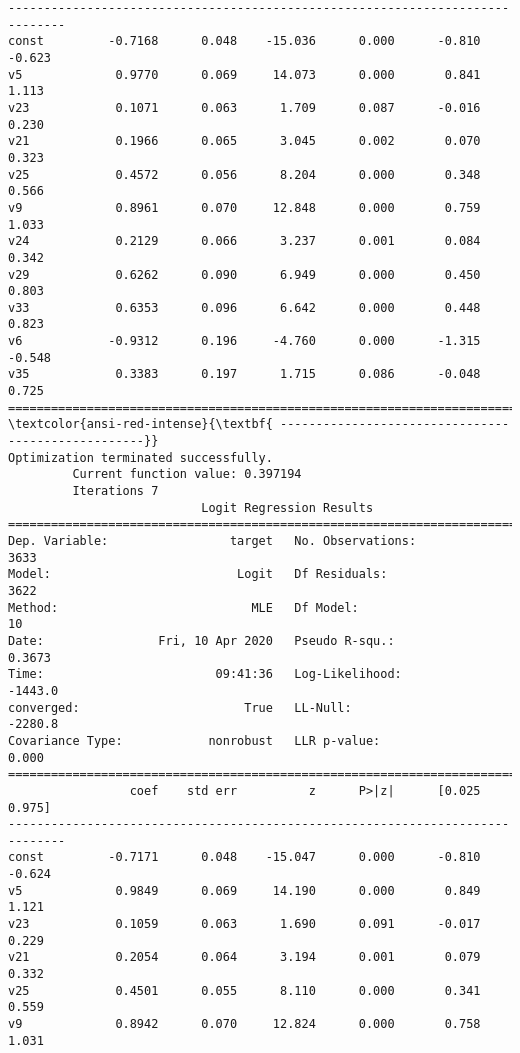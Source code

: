 \documentclass[11pt]{article}
\begin{document}
\begin{Verbatim}[commandchars=\\\{\}]
------------------------------------------------------------------------------
const         -0.7168      0.048    -15.036      0.000      -0.810      -0.623
v5             0.9770      0.069     14.073      0.000       0.841       1.113
v23            0.1071      0.063      1.709      0.087      -0.016       0.230
v21            0.1966      0.065      3.045      0.002       0.070       0.323
v25            0.4572      0.056      8.204      0.000       0.348       0.566
v9             0.8961      0.070     12.848      0.000       0.759       1.033
v24            0.2129      0.066      3.237      0.001       0.084       0.342
v29            0.6262      0.090      6.949      0.000       0.450       0.803
v33            0.6353      0.096      6.642      0.000       0.448       0.823
v6            -0.9312      0.196     -4.760      0.000      -1.315      -0.548
v35            0.3383      0.197      1.715      0.086      -0.048       0.725
==============================================================================
\textcolor{ansi-red-intense}{\textbf{ ---------------------------------------------------}}
Optimization terminated successfully.
         Current function value: 0.397194
         Iterations 7
                           Logit Regression Results                           
==============================================================================
Dep. Variable:                 target   No. Observations:                 3633
Model:                          Logit   Df Residuals:                     3622
Method:                           MLE   Df Model:                           10
Date:                Fri, 10 Apr 2020   Pseudo R-squ.:                  0.3673
Time:                        09:41:36   Log-Likelihood:                -1443.0
converged:                       True   LL-Null:                       -2280.8
Covariance Type:            nonrobust   LLR p-value:                     0.000
==============================================================================
                 coef    std err          z      P>|z|      [0.025      0.975]
------------------------------------------------------------------------------
const         -0.7171      0.048    -15.047      0.000      -0.810      -0.624
v5             0.9849      0.069     14.190      0.000       0.849       1.121
v23            0.1059      0.063      1.690      0.091      -0.017       0.229
v21            0.2054      0.064      3.194      0.001       0.079       0.332
v25            0.4501      0.055      8.110      0.000       0.341       0.559
v9             0.8942      0.070     12.824      0.000       0.758       1.031

\end{Verbatim}
\end{document}
